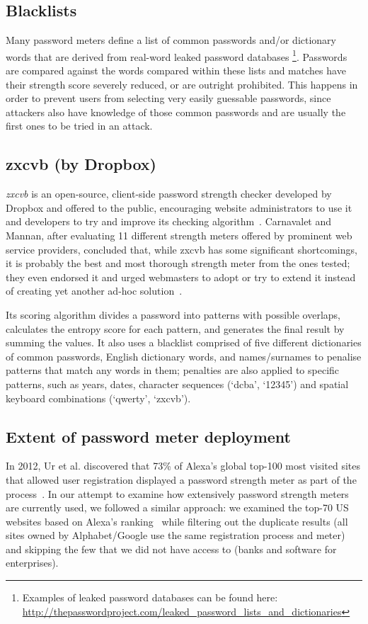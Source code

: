   \subsection{Blacklists}
    \label{ssec:blacklists}
    Many password meters define a list of common passwords and/or dictionary words that are derived from real-word leaked password databases \footnote{Examples of leaked password databases can be found here: \url{http://thepasswordproject.com/leaked_password_lists_and_dictionaries}}. Passwords are compared against the words compared within these lists and matches have their strength score severely reduced, or are outright prohibited. This happens in order to prevent users from selecting very easily guessable passwords, since attackers also have knowledge of those common passwords and are usually the first ones to be tried in an attack.

  \subsection{zxcvb (by Dropbox)}
    \label{ssec:zxcvb}
    \emph{zxcvb} is an open-source, client-side password strength checker developed by Dropbox and offered to the public, encouraging website administrators to use it and developers to try and improve its checking algorithm~\cite{dropbox_str}. Carnavalet and Mannan, after evaluating 11 different strength meters offered by prominent web service providers, concluded that, while zxcvb has some significant shortcomings, it is probably the best and most thorough strength meter from the ones tested; they even endorsed it and urged webmasters to adopt or try to extend it instead of creating yet another ad-hoc solution~\cite{pass_str_meter_analysis}.

    Its scoring algorithm divides a password into patterns with possible overlaps, calculates the entropy score for each pattern, and generates the final result by summing the values. It also uses a blacklist comprised of five different dictionaries of common passwords, English dictionary words, and names/surnames to penalise patterns that match any words in them; penalties are also applied to specific patterns, such as years, dates, character sequences (\eg `dcba', `12345') and spatial keyboard combinations (\eg `qwerty', `zxcvb').

  \subsection{Extent of password meter deployment}
    \label{ssec:meter_extent_use}
    In 2012, Ur et al. discovered that 73\% of Alexa's global top-100 most visited sites that allowed user registration displayed a password strength meter as part of the process~\cite{strength_meter_effect}. In our attempt to examine how extensively password strength meters are currently used, we followed a similar approach: we examined the top-70 US websites based on Alexa's ranking~\cite{alexa_100} while filtering out the duplicate results (\eg all sites owned by Alphabet/Google use the same registration process and meter) and skipping the few that we did not have access to (banks and software for enterprises).


